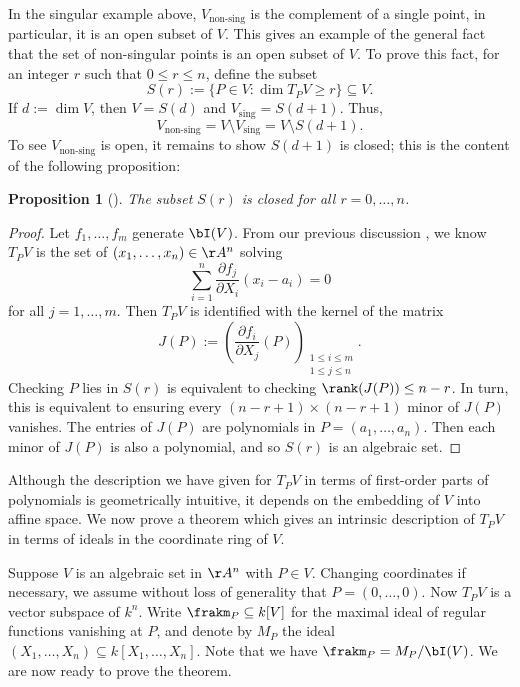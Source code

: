 \documentclass[12pt]{amsart}
\theoremstyle{plain}
\newtheorem{proposition}[theorem]{Proposition}
\theoremstyle{definition}
\begin{document}
In the singular example above, $V_{\text{non-sing}}$ is the complement of a single point, in particular, it is an open subset of $V$.
This gives an example of the general fact that the set of non-singular points is an open subset of $V$.
To prove this fact, for an integer $r$ such that $0 \le r \le n$, define the subset
$$S(r) := \{P \in V : \dim T_P V \ge r\}\subseteq V.$$
If $d := \dim V$, then $V = S(d)$ and $V_{\text{sing}} = S(d+1)$.
Thus,
$$V_{\text{non-sing}} = V \setminus V_{\text{sing}} = V \setminus S(d+1).$$
To see $V_{\text{non-sing}}$ is open, it remains to show $S(d+1)$ is closed; this is the content of the following proposition:

\begin{proposition}[{\cite[\S 6.5]{Reid88}}]
The subset $S(r)$ is closed for all $r=0, \ldots, n$.
\end{proposition}
\begin{proof}
Let $f_1, \ldots, f_m$ generate $\bI(V)$.
From our previous discussion , we know $T_PV$ is the set of $(x_1, \ldots, x_n) \in \AA^n$ solving
$$\sum_{i=1}^n \frac{\partial f_j}{\partial X_i} (x_i - a_i) = 0$$
for all $j = 1, \ldots, m.$
Then $T_PV$ is identified with the kernel of the matrix 
$$J(P) := \left(\frac{\partial f_i}{\partial X_j}(P)\right)_{\substack{1 \le i \le m \\ 1 \le j \le n}}.$$
Checking $P$ lies in $S(r)$ is equivalent to checking $\rank (J(P)) \le n-r$.
In turn, this is equivalent to ensuring every $(n-r+1)\times(n-r+1)$ minor of $J(P)$ vanishes.
The entries of $J(P)$ are polynomials in $P=(a_1, \ldots, a_n)$.
Then each minor of $J(P)$ is also a polynomial, and so $S(r)$ is an algebraic set.
\end{proof}

Although the description we have given for $T_PV$ in terms of first-order parts of polynomials is geometrically intuitive, it depends on the embedding of $V$ into affine space.
We now prove a theorem which gives an intrinsic description of $T_PV$ in terms of ideals in the coordinate ring of $V$.

Suppose $V$ is an algebraic set in $\AA^n$ with $P \in V$.
Changing coordinates if necessary, we assume without loss of generality that $P=(0, \ldots, 0)$.
Now $T_PV$ is a vector subspace of $k^n$.
Write $\frakm_P\subseteq k[V]$ for the maximal ideal of regular functions vanishing at $P$, and denote by $M_P$ the ideal $(X_1, \ldots, X_n) \subseteq k[X_1,\ldots, X_n]$.
Note that we have $\frakm_P=M_P/\bI(V)$.
We are now ready to prove the theorem.
\end{document}
